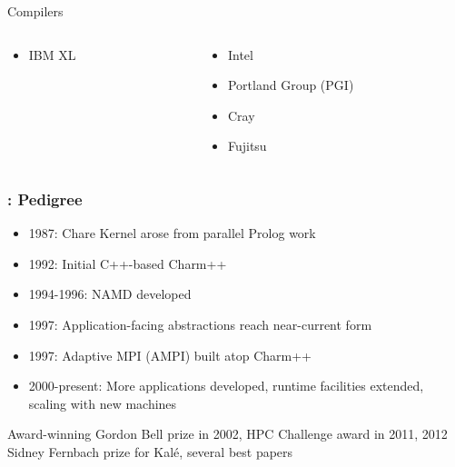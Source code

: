 \begin{frame}
{{\begin{block}{\small Compilers}
\begin{columns}
\begin{column}{0.45\textwidth}
\begin{itemize}
            \item IBM XL
        \end{itemize}
    \end{column}
    \begin{column}{0.45\textwidth}
        \begin{itemize}
            \item Intel
            \item Portland Group (PGI)
            \item Cray
            \item Fujitsu
        \end{itemize}
    \end{column}
    \end{columns}
\end{block}
}
}
\end{frame}


\begin{frame}
\frametitle{\charm: Pedigree}
\begin{itemize}
\item 1987: Chare Kernel arose from parallel Prolog work
\item 1992: Initial C++-based Charm++
\item 1994-1996: NAMD developed
\item 1997: Application-facing abstractions reach near-current form
\item 1997: Adaptive MPI (AMPI) built atop Charm++
\item 2000-present: More applications developed, runtime facilities extended, scaling with new machines
\end{itemize}
\pause
\begin{block}{Award-winning}
Gordon Bell prize in 2002, HPC Challenge award in 2011, 2012 Sidney Fernbach prize for Kal\'e, several best papers
\end{block}
\end{frame}
